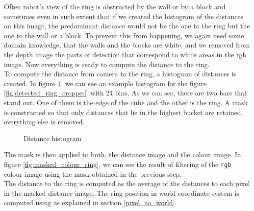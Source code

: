 \documentclass[12pt,a4paper]{article}
\begin{document}
	Often robot's view of the ring is obstructed by the wall or by a block and sometimes even in such extent that if we created the histogram of the distances on this image, the predominant distance would not be the one to the ring but the one to the wall or a block. To prevent this from happening, we again used some domain knowledge, that the walls and the blocks are white, and we removed from the depth image the parts of detection that correspond to white areas in the rgb image. Now everything is ready to compute the distance to the ring. \\
	
	To compute the distance from camera to the ring, a histogram of distances is created. In figure \ref{fig:distance_histogram}, we can see an example histogram for the figure \ref{fig:detected_ring_cropped} with 24 bins. As we can see, there are two bars that stand out. One of them is the edge of the cube and the other is the ring. A mask is constructed so that only distances that lie in the highest bucket are retained, everything else is removed. \\
	
	\begin{figure}[H]
		\centering
		\caption{Distance histogram}
		\label{fig:distance_histogram}
	\end{figure}

	The mask is then applied to both, the distance image and the colour image. In figure \ref{fig:masked_colour_ring}, we can see the result of filtering of the \texttt{rgb} colour image using the mask obtained in the previous step. \\

	The distance to the ring is computed as the average of the distances to each pixel in the masked distance image. The ring position in world coordinate system is computed using as explained in section \ref{pixel_to_world}. \\
\end{document}
